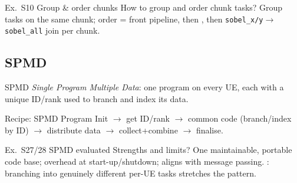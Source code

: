 \begin{example2}{Ex.\ S10 Group \& order chunks}
    How to group and order chunk tasks?
    \tcblower
    Group tasks on the same chunk; order = front pipeline, then , then \texttt{sobel\_x/y}$\to$\texttt{sobel\_all} join per chunk.
\end{example2}

\subsection{SPMD}

\begin{concept}{SPMD}
    \emph{Single Program Multiple Data}: one program on every UE, each with a unique ID/rank used to branch and index its data.
\end{concept}

\begin{KR}{Recipe: SPMD Program}
    Init $\to$ get ID/rank $\to$ common code (branch/index by ID) $\to$ distribute data $\to$ collect+combine $\to$ finalise.
\end{KR}

\begin{example2}{Ex.\ S27/28 SPMD evaluated}
    Strengths and limits?
    \tcblower
    One maintainable, portable code base; overhead at start-up/shutdown; aligns with message passing. : branching into genuinely different per-UE tasks stretches the pattern.
\end{example2}
